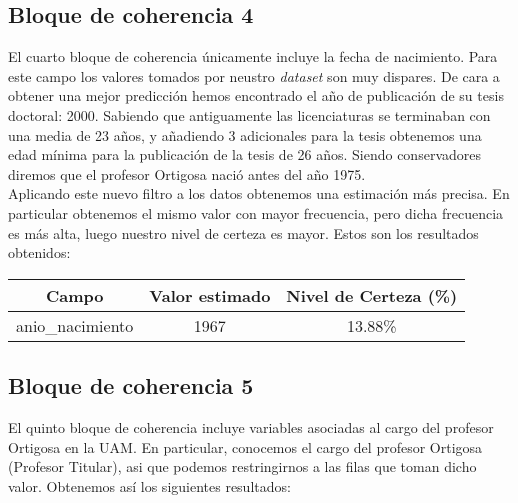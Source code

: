 \documentclass[a4paper]{article}
\begin{document}
\subsection{Bloque de coherencia 4}

El cuarto bloque de coherencia únicamente incluye la fecha de nacimiento. Para este campo los valores tomados por neustro \emph{dataset} son muy dispares. De cara a obtener una mejor predicción hemos encontrado el año de publicación de su tesis doctoral: 2000. Sabiendo que antiguamente las licenciaturas se terminaban con una media de 23 años, y añadiendo 3 adicionales para la tesis obtenemos una edad mínima para la publicación de la tesis de 26 años. Siendo conservadores diremos que el profesor Ortigosa nació antes del año 1975. \\

Aplicando este nuevo filtro a los datos obtenemos una estimación más precisa. En particular obtenemos el mismo valor con mayor frecuencia, pero dicha frecuencia es más alta, luego nuestro nivel de certeza es mayor. Estos son los resultados obtenidos:

\begin{table}[H]
	\centering
	\begin{tabular}{ccc}
		\textbf{Campo}             & \textbf{Valor estimado} & \textbf{Nivel de Certeza (\%)} \\ \hline
		anio\_nacimiento           & 1967                    & 13.88\%                         \\           
	\end{tabular}
\end{table}

\subsection{Bloque de coherencia 5}

El quinto bloque de coherencia incluye variables asociadas al cargo del profesor Ortigosa en la UAM. En particular, conocemos el cargo del profesor Ortigosa (Profesor Titular), asi que podemos restringirnos a las filas que toman dicho valor. Obtenemos así los siguientes resultados:
\end{document}
